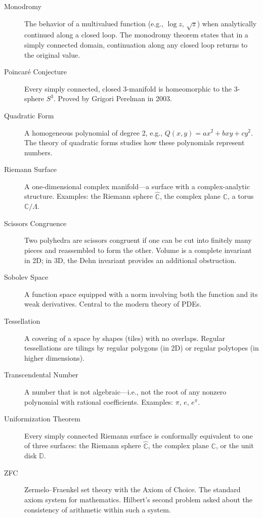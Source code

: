 \begin{description}
    \item[Monodromy] The behavior of a multivalued function (e.g., $\log z$, $\sqrt{z}$) when analytically continued along a closed loop. The monodromy theorem states that in a simply connected domain, continuation along any closed loop returns to the original value.

    \item[Poincar\'e Conjecture] Every simply connected, closed 3-manifold is homeomorphic to the 3-sphere $S^3$. Proved by Grigori Perelman in 2003.

    \item[Quadratic Form] A homogeneous polynomial of degree 2, e.g., $Q(x, y) = ax^2 + bxy + cy^2$. The theory of quadratic forms studies how these polynomials represent numbers.

    \item[Riemann Surface] A one-dimensional complex manifold---a surface with a complex-analytic structure. Examples: the Riemann sphere $\widehat{\mathbb{C}}$, the complex plane $\mathbb{C}$, a torus $\mathbb{C}/\Lambda$.

    \item[Scissors Congruence] Two polyhedra are scissors congruent if one can be cut into finitely many pieces and reassembled to form the other. Volume is a complete invariant in 2D; in 3D, the Dehn invariant provides an additional obstruction.

    \item[Sobolev Space] A function space equipped with a norm involving both the function and its weak derivatives. Central to the modern theory of PDEs.

    \item[Tessellation] A covering of a space by shapes (tiles) with no overlaps. Regular tessellations are tilings by regular polygons (in 2D) or regular polytopes (in higher dimensions).

    \item[Transcendental Number] A number that is not algebraic---i.e., not the root of any nonzero polynomial with rational coefficients. Examples: $\pi$, $e$, $e^{\pi}$.

    \item[Uniformization Theorem] Every simply connected Riemann surface is conformally equivalent to one of three surfaces: the Riemann sphere $\widehat{\mathbb{C}}$, the complex plane $\mathbb{C}$, or the unit disk $\mathbb{D}$.

    \item[ZFC] Zermelo--Fraenkel set theory with the Axiom of Choice. The standard axiom system for mathematics. Hilbert's second problem asked about the consistency of arithmetic within such a system.
\end{description}
